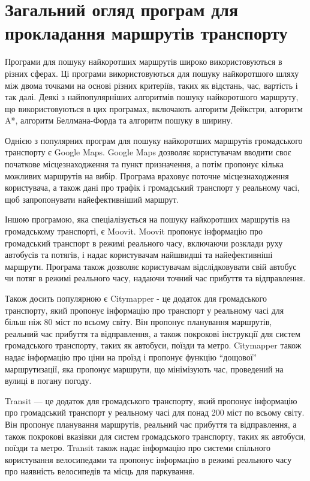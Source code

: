 \section{Загальний огляд програм для прокладання маршрутів транспорту}
\label{sec:existing-sulutions}

Програми для пошуку найкоротших маршрутів широко використовуються в різних сферах. Ці програми використовуються для пошуку найкоротшого шляху між двома точками на основі різних критеріїв, таких як відстань, час, вартість і так далі. Деякі з найпопулярніших алгоритмів пошуку найкоротшого маршруту, що використовуються в цих програмах, включають алгоритм Дейкстри, алгоритм A*, алгоритм Беллмана-Форда та алгоритм пошуку в ширину.

Однією з популярних програм для пошуку найкоротших маршрутів громадського транспорту є Google Maps. Google Maps дозволяє користувачам вводити своє початкове місцезнаходження та пункт призначення, а потім пропонує кілька можливих маршрутів на вибір. Програма враховує поточне місцезнаходження користувача, а також дані про трафік і громадський транспорт у реальному часі, щоб запропонувати найефективніший маршрут.

Іншою програмою, яка спеціалізується на пошуку найкоротших маршрутів на громадському транспорті, є Moovit. Moovit пропонує інформацію про громадський транспорт в режимі реального часу, включаючи розклади руху автобусів та потягів, і надає користувачам найшвидші та найефективніші маршрути. Програма також дозволяє користувачам відслідковувати свій автобус чи потяг в режимі реального часу, надаючи точний час прибуття та відправлення.

Також досить популярною є Citymapper - це додаток для громадського транспорту, який пропонує інформацію про транспорт у реальному часі для більш ніж 80 міст по всьому світу. Він пропонує планування маршрутів, реальний час прибуття та відправлення, а також покрокові інструкції для систем громадського транспорту, таких як автобуси, поїзди та метро. Citymapper також надає інформацію про ціни на проїзд і пропонує функцію ``дощової'' маршрутизації, яка пропонує маршрути, що мінімізують час, проведений на вулиці в погану погоду.

Transit --- це додаток для громадського транспорту, який пропонує інформацію про громадський транспорт у реальному часі для понад 200 міст по всьому світу. Він пропонує планування маршрутів, реальний час прибуття та відправлення, а також покрокові вказівки для систем громадського транспорту, таких як автобуси, поїзди та метро. Transit також надає інформацію про системи спільного користування велосипедами та пропонує інформацію в режимі реального часу про наявність велосипедів та місць для паркування.

